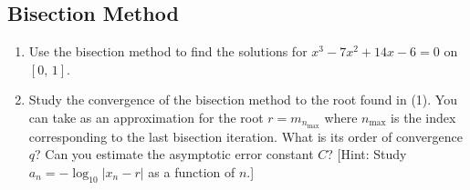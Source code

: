 \subsection{Bisection Method}

\begin{exercise}
	\begin{enumerate}
		\item Use the bisection method to find the solutions for $x^3 - 7x^2 +
			      14x - 6 = 0$ on $[0,\, 1]$.
		\item Study the convergence of the bisection method to the root found in (1).
		      You can take as an approximation for the root $r = m_{n_\text{max}}$
		      where $n_\text{max}$ is the index corresponding to the last bisection
		      iteration. What is its order of convergence $q$? Can you estimate the
		      asymptotic error constant $C$? [Hint: Study $a_{n} = -\log_{10}\lvert
				      x_{n} - r \rvert$ as a function of $n$.]
	\end{enumerate}
\end{exercise}

